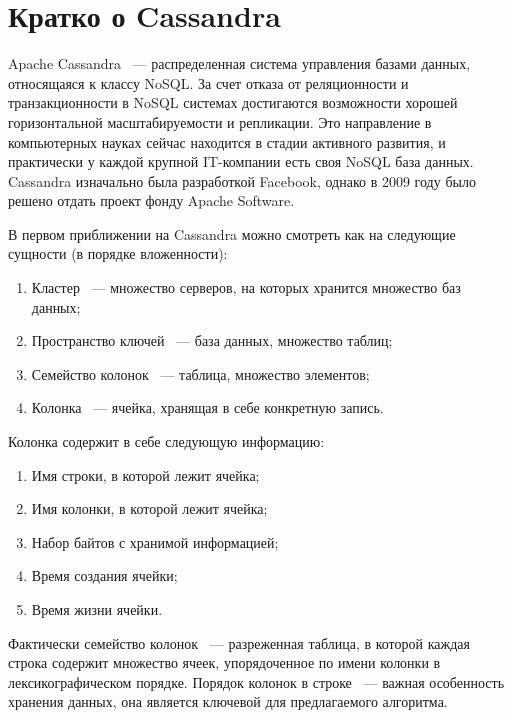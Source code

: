 \section{Кратко о Cassandra}

Apache Cassandra ~--- распределенная система управления базами данных, относящаяся к классу NoSQL. За счет отказа от реляционности и транзакционности в NoSQL системах достигаются возможности хорошей горизонтальной масштабируемости и репликации. Это направление в компьютерных науках сейчас находится в стадии активного развития, и практически у каждой крупной IT-компании есть своя NoSQL база данных. Cassandra изначально была разработкой Facebook, однако в 2009 году было решено отдать проект фонду Apache Software.

В первом приближении на Cassandra можно смотреть как на следующие сущности (в порядке вложенности):

\begin{enumerate}
	\item Кластер ~--- множество серверов, на которых хранится множество баз данных;
	\item Пространство ключей ~--- база данных, множество таблиц;
	\item Семейство колонок ~--- таблица, множество элементов;
	\item Колонка ~--- ячейка, хранящая в себе конкретную запись.
\end{enumerate}

Колонка содержит в себе следующую информацию:

\begin{enumerate}
	\item Имя строки, в которой лежит ячейка;
	\item Имя колонки, в которой лежит ячейка;
	\item Набор байтов с хранимой информацией;
	\item Время создания ячейки;
	\item Время жизни ячейки.
\end{enumerate}

Фактически семейство колонок ~--- разреженная таблица, в которой каждая строка содержит множество ячеек, упорядоченное по имени колонки в лексикографическом порядке. Порядок колонок в строке ~--- важная особенность хранения данных, она является ключевой для предлагаемого алгоритма.